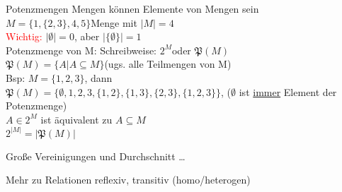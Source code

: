 \begin{frame}{Potenzmengen}
	Mengen können Elemente von Mengen sein\\
	$M = \{1, \{2, 3\}, 4, 5\} $Menge mit $\lvert M\rvert = 4$\\
	\textcolor{red}{Wichtig:} $\lvert \emptyset\rvert = 0$, aber $\lvert\{\emptyset\}\rvert = 1$\\
	Potenzmenge von M: Schreibweise: $2^M $oder $\mathfrak{P}(M)$\\
	$\mathfrak{P}(M) = \{ A\vert A\subseteq M\}$(ugs. alle Teilmengen von M)\\
	Bsp: $M = \{1, 2, 3\}$, dann\\
	$\mathfrak{P}(M) =\{\emptyset ,1, 2, 3, \{1, 2\}, \{1, 3\}, \{2, 3\}, \{1,2,3\}\}$, ($\emptyset$ ist \underline{immer} Element der Potenzmenge)\\
	$A\in 2^M$ ist äquivalent zu $A\subseteq M$\\
	$2^{\lvert M\rvert} = \lvert\mathfrak{P}(M)\rvert$
\end{frame}

\begin{frame}{Große Vereinigungen und Durchschnitt}
	\dots%
\end{frame}

\begin{frame}{Mehr zu Relationen}
	reflexiv, transitiv (homo/heterogen)
\end{frame}


